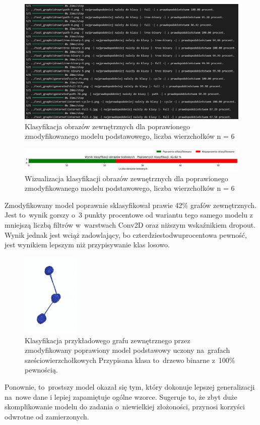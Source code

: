 \begin{figure}[ht]
	\centering
	\includegraphics[width=15.5cm]{resources/tests/images/v4/base6_1_1_txt.png}
	\caption{Klasyfikacja obrazów zewnętrznych dla poprawionego zmodyfikowanego modelu podstawowego, liczba wierzchołków n = 6}
	\label{Fig:tests-best-2b}
\end{figure}
\FloatBarrier

\begin{figure}[ht]
	\centering
	\includegraphics[width=15.5cm]{resources/tests/images/v4/base6_1_1_bar.png}
	\caption{Wizualizacja klasyfikacji obrazów zewnętrznych dla poprawionego zmodyfikowanego modelu podstawowego, liczba wierzchołków n = 6}
	\label{Fig:tests-best-1c}
\end{figure}
\FloatBarrier

Zmodyfikowany model poprawnie sklasyfikował prawie 42\% grafów zewnętrznych.
Jest to~wynik gorszy o~3 punkty procentowe od wariantu tego samego modelu
z mniejszą liczbą filtrów w~warstwach Conv2D oraz niższym wskaźnikiem dropout.
Wynik jednak jest wciąż zadowlający, bo czterdziestodwuprocentowa pewność,
jest wynikiem lepszym niż przypisywanie klas losowo.

\begin{figure}[ht]
	\centering
	\includegraphics[height=4cm]{../graph_classification/test_graphs/drawn/path-4.png}
	\caption{Klasyfikacja przykładowego grafu zewnętrznego przez zmodyfikowany poprawiony model podstawowy
		uczony na~grafach sześciowierzchołkowych
		Przypisana klasa to~drzewo binarne z~100\% pewnością.}
	\label{Fig:tests-best-1d}
\end{figure}
\FloatBarrier

Ponownie, to~prostszy model okazał się tym, który dokonuje lepszej generalizacji na~nowe dane
i lepiej zapamiętuje ogólne wzorce.
Sugeruje to, że zbyt duże skomplikowanie modelu do zadania o~niewielkiej złożoności,
przynosi korzyści odwrotne od zamierzonych.